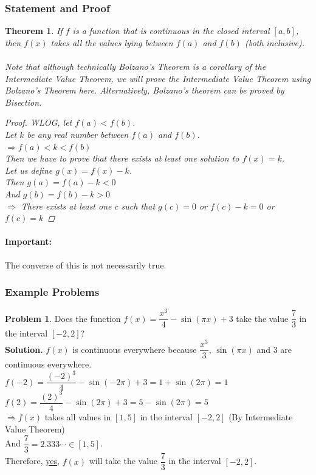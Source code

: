 \documentclass[14]{article}
\newtheorem{theorem}{Theorem}
\theoremstyle{definition}
\newtheorem{prob}{Problem}
\begin{document}
\subsubsection{Statement and Proof}
\begin{theorem}
If $f$ is a function that is continuous in the closed interval $[a, b]$, then $f(x)$ takes all the values lying between $f(a)$ and $f(b)$ (both inclusive).\\\\
Note that although technically Bolzano's Theorem is a corollary of the Intermediate Value Theorem, we will prove the Intermediate Value Theorem using Bolzano's Theorem here. Alternatively, Bolzano's theorem can be proved by Bisection.
\begin{proof}
WLOG, let $f(a) < f(b)$.\\
Let $k$ be any real number between $f(a)$ and $f(b)$.\\
$\Rightarrow f(a) < k < f(b)$\\
Then we have to prove that there exists at least one solution to $f(x) = k$.\\
Let us define $g(x) = f(x) - k$.\\
Then $g(a) = f(a) - k < 0$\\
And $g(b) = f(b) - k > 0$\\
$\Rightarrow$ There exists at least one $c$ such that $g(c) = 0$ or $f(c) - k = 0$ or $f(c) = k$
\end{proof}
\end{theorem}
\paragraph{Important:} The converse of this is not necessarily true.
\subsubsection{Example Problems}
\begin{prob}
Does the function $f(x) = \dfrac{x^3}{4} - \sin(\pi x) + 3$ take the value $\dfrac{7}{3}$ in the interval $[-2, 2]$?\\
\textbf{Solution.}
$f(x)$ is continuous everywhere because $\dfrac{x^3}{3}$, $\sin(\pi x)$ and $3$ are continuous everywhere.\\
$f(-2) = \dfrac{(-2)^3}{4} - \sin(-2\pi) + 3 = 1 + \sin(2\pi) = 1$\\
$f(2) = \dfrac{(2)^3}{4} - \sin(2\pi) + 3 = 5 - \sin(2\pi) = 5$\\
$\Rightarrow f(x)$ takes all values in $[1, 5]$ in the interval $[-2, 2]$ (By Intermediate Value Theorem)\\
And $\dfrac{7}{3} = 2.333\cdots \in [1, 5]$.\\
Therefore, \underline{yes}, $f(x)$ will take the value $\dfrac{7}{3}$ in the interval $[-2, 2]$.
\end{prob}
\end{document}
